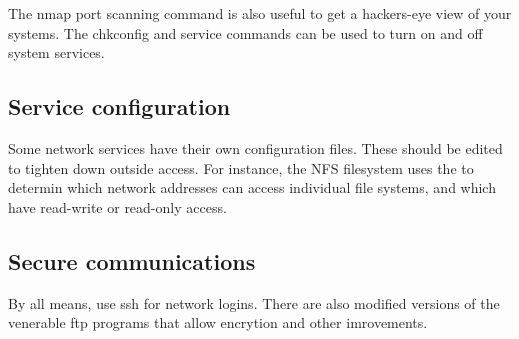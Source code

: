 The nmap port scanning command is also useful to get a hackers-eye view of
your systems.  The chkconfig and service commands can be used to turn
on and off system services.

\subsection{Service configuration}

Some network services have their own configuration files. These should be 
edited to tighten down outside access.  For instance, the NFS filesystem
uses the  to determin which network addresses can access
individual file systems, and which have read-write or read-only access.

\subsection{Secure communications}

By all means, use ssh for network logins.  There are also modified versions
of the venerable ftp programs that allow encrytion and other imrovements.

